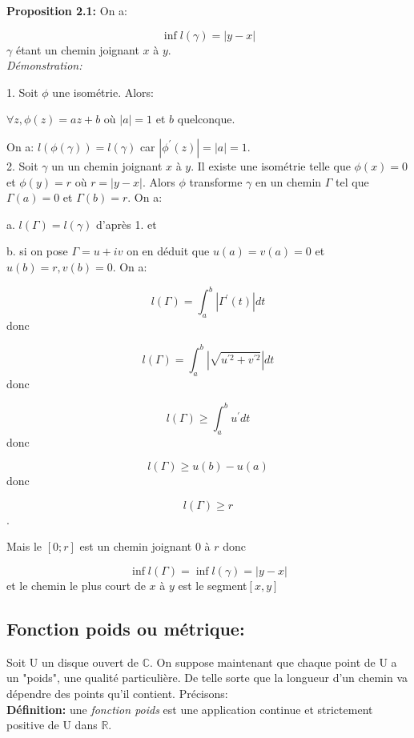 \documentclass[a4paper, 12pt, twoside]{book}
\begin{document}
 \textbf{Proposition 2.1:}  On a:\
 
  $$\inf l(\gamma)=|y-x|$$   $\gamma$ étant un chemin joignant $x$ à $y$. \\
  
  \textit{Démonstration:}\
  
   1. Soit $\phi$ une isométrie. Alors:\
  
  $\forall z, \phi(z)=az+b$ où $|a|=1$ et $b$ quelconque.\
  
  On a: $l(\phi(\gamma))=l(\gamma)$ car $|\phi^{'}(z)|=|a|=1$.\\
  
  2. Soit $\gamma$ un un chemin joignant $x$ à $y$. Il existe une isométrie telle que $\phi(x)=0$ et $\phi(y)=r$ où $r=|y-x|$. Alors $\phi$ transforme $\gamma$ en un chemin $\Gamma$ tel que $\Gamma(a)=0$ et $\Gamma(b)=r$. On a:\
  
  a. $l(\Gamma)=l(\gamma)$ d'après 1. et \
  
  b. si on pose $\Gamma=u +iv$ on en déduit que $u(a)=v(a)=0$ et $u(b)=r, v(b)=0$. On a:\
  
   $$l(\Gamma)=\int_{a}^{b} |\Gamma^{'}(t)|dt$$ donc\
   
   
   $$l(\Gamma)=\int_{a}^{b} |\sqrt{u^{'2}+v^{'2}}|dt$$ donc\
   
    
    $$l(\Gamma)\geq \int_{a}^{b} u^{'}dt $$ donc\
   
    $$l(\Gamma)\geq u(b)-u(a)$$ donc \
    
    $$l(\Gamma)\geq r$$.\
    
    Mais le $[0; r]$ est un chemin joignant 0 à $r$ donc\
    
     $$\inf l(\Gamma)=\inf l(\gamma)=|y-x|$$  et le chemin le plus court de $x$ à $y$ est le segment$[x, y]$\\
     
       
  
  \subsection{Fonction poids ou métrique:}
  
Soit U un disque ouvert de $\mathbb{C}$.  On suppose maintenant que chaque point de U a un "poids", une qualité particulière. De telle sorte que la longueur d'un chemin va dépendre des points qu'il contient. Précisons:\\
 
 \textbf{Définition:} une \textit{fonction poids} est une application continue et strictement positive de U dans $\mathbb{R}$.\\
 
\end{document}
